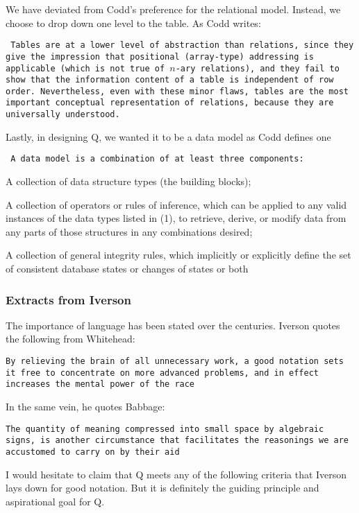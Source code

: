 We have deviated from Codd's preference for the relational model.
Instead, we choose to drop down one level to the table. As Codd writes:

{\tt 
  Tables are at a lower level of abstraction than relations, since they
    give the impression that positional (array-type) addressing is
    applicable (which is not true of \(n\)-ary relations), and they fail
    to show that the information content of a table is independent of
    row order. Nevertheless, even with these minor flaws, tables are the
    most important conceptual representation of relations, because they
    are universally understood.

}

Lastly, in designing Q, we wanted it to be a data model as Codd defines
one

{\tt
A data model is a combination of at least three components:
  \be
  \item A collection of data structure types (the building blocks);
\item A collection of operators or rules of inference, which can be
  applied to any valid instances of the data types listed in (1), to
  retrieve, derive, or modify data from any parts of those structures in
  any combinations desired;
\item A collection of general  integrity rules, which implicitly or
  explicitly define the set of consistent database states or changes of
  states or both
  \ee

}

\subsubsection{Extracts from Iverson}

The importance of language has been stated over the centuries. Iverson
quotes the following from Whitehead:

{\tt By relieving the brain of all unnecessary work, a good notation
  sets it free to concentrate on more advanced problems, and in effect
    increases the mental power of the race}

In the same vein, he quotes Babbage:

{\tt The quantity of meaning compressed into small space by algebraic
  signs, is another circumstance that facilitates the reasonings we are
    accustomed to carry on by their aid}

I would hesitate to claim that Q meets any of the following criteria
that Iverson lays down for good notation. But it is  definitely the
guiding principle and aspirational goal for Q.

